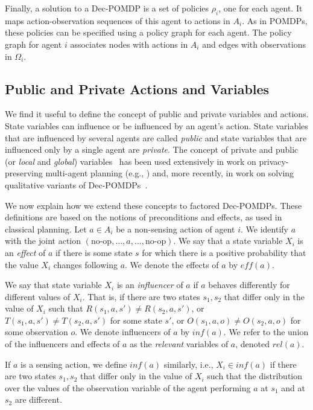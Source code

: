 \documentclass[letterpaper]{article} %
\theoremstyle{definition}
\newcommand{\eff}{\mathit{eff}}
\begin{document}
Finally, a solution to a Dec-POMDP is a set of policies $\rho_i$, one for each agent. It maps action-observation sequences of this agent to actions in $A_i$.
As in POMDPs, these policies can be specified using a policy graph for each agent. The policy graph for agent $i$ associates nodes with actions in $A_i$
and edges with observations in $\Omega_i$. 

\subsection{Public and Private Actions and Variables}

We find it useful to define the concept of public and private variables and actions. State variables can influence or be influenced by an agent's action. State variables that are influenced by several agents are called {\em public} and state variables that are influenced only by a single agent are {\em private}.
The concept of private and public (or \emph{local} and \emph{global}) variables~\cite{FACTOREDPLAN} has been used extensively
in work on privacy-preserving multi-agent planning
(e.g., \cite{NB14,MaliahBS17}) and, more recently, in work on solving qualitative variants of Dec-POMDPs~\cite{QDECPOMDPPLAN1,QDECPOMDPPLAN2}. 

We now explain how we extend these concepts to factored Dec-POMDPs. These definitions are based on the notions of
preconditions and effects, as used in classical planning.
Let $a\in A_i$ be a non-sensing action of agent $i$. We identify $a$ with the joint action $(\mbox{no-op},\ldots, a,\ldots,\mbox{no-op})$. 
We say that a state variable $X_i$ is an {\em effect} of $a$ if there is some state $s$ for which there is a positive probability that the value $X_i$ changes following $a$.
We denote the effects of $a$ by $\eff(a)$.

We say that state variable $X_i$ is an
{\em influencer} of $a$ if $a$ behaves differently for different values of $X_i$.
That is, if there are two states $s_1,s_2$ that differ only in the value of $X_i$ such that $R(s_1,a,s')\neq R(s_2,a,s')$, or $T(s_1,a,s')\neq T(s_2,a,s')$ for some state $s'$, or $O(s_1,a,o)\neq O(s_2,a,o)$ for some observation $o$.
We denote influencers of $a$ by
$inf(a)$.
%
We refer to the union of the influencers and effects of $a$ as
the {\em relevant} variables of $a$,
denoted $rel(a)$. 

If $a$ is a sensing action, we define $inf(a)$ similarly, i.e.,
$X_i\in inf(a)$ if there are two states $s_1,s_2$ that differ only in the value of $X_i$ such that the distribution over the values of the observation variable of the agent performing $a$ at $s_1$ and at $s_2$ are different.
\end{document}
